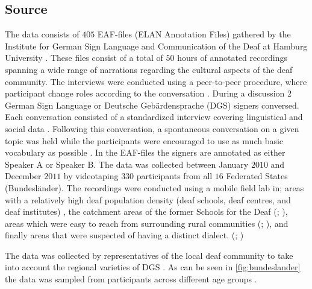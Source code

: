 \subsection{Source}

The data consists of $405$ EAF-files (ELAN Annotation Files) gathered by the Institute for German Sign Language and Communication of the Deaf at Hamburg University \cite{prillwitz2008dgs}. These files consist of a total of $50$ hours of annotated recordings spanning a wide range of narrations regarding the cultural aspects of the deaf community. The interviews were conducted using a peer-to-peer procedure, where participant change roles according to the conversation \cite{prillwitz2008dgs}. During a discussion $2$ German Sign Language or Deutsche Gebärdensprache (DGS) signers conversed. Each conversation consisted of a standardized interview covering linguistical and social data \cite{deaf_areas}. Following this conversation, a spontaneous conversation on a given topic was held while the participants were encouraged to use as much basic vocabulary as possible \cite{deaf_areas}. In the EAF-files the signers are annotated as either Speaker A or Speaker B. The data was collected between January $2010$ and December $2011$  by videotaping $330$ participants from all $16$ Federated States (Bundesländer). The recordings were conducted using a mobile field lab in; areas with a relatively high deaf population density (deaf schools, deaf centres, and deaf institutes) \cite{age_data_hamburg} \cite{deaf_areas}, the catchment areas of the former Schools for the Deaf (\citealp{age_data_hamburg}; \citealp{prillwitz2008dgs}), areas which were easy to reach from surrounding rural communities (\citealp{age_data_hamburg}; \citealp{deaf_areas}), and finally areas that were suspected of having a distinct dialect. (\citealp{age_data_hamburg}; \citealp{prillwitz2008dgs})


 The data was collected by representatives of the local deaf community to take into account the regional varieties of DGS \cite{deaf_areas}. As can be seen in \autoref{fig:bundeslander} the data was sampled from participants across different age groups \cite{age_data_hamburg}. 


\mydata

